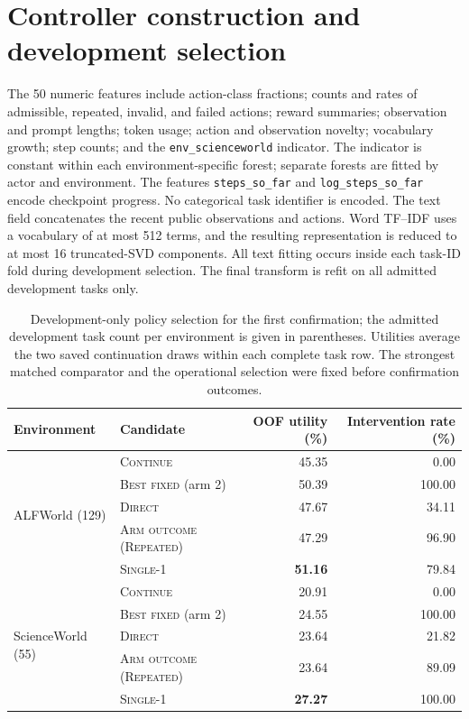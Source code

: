 \section{Controller construction and development selection}
\label{app:controller}

The 50 numeric features include action-class fractions; counts and rates of admissible, repeated, invalid, and failed actions; reward summaries; observation and prompt lengths; token usage; action and observation novelty; vocabulary growth; step counts; and the \texttt{env\_scienceworld} indicator. The indicator is constant within each environment-specific forest; separate forests are fitted by actor and environment. The features \texttt{steps\_so\_far} and \texttt{log\_steps\_so\_far} encode checkpoint progress. No categorical task identifier is encoded. The text field concatenates the recent public observations and actions. Word TF--IDF uses a vocabulary of at most 512 terms, and the resulting representation is reduced to at most 16 truncated-SVD components. All text fitting occurs inside each task-ID fold during development selection. The final transform is refit on all admitted development tasks only.

\begin{table}[ht]
\caption{Development-only policy selection for the first confirmation; the admitted development task count per environment is given in parentheses. Utilities average the two saved continuation draws within each complete task row. The strongest matched comparator and the operational selection were fixed before confirmation outcomes.}
\label{tab:development}
\centering
\small
\begin{tabular}{@{}llrr@{}}
\toprule
Environment & Candidate & OOF utility (\%) & Intervention rate (\%) \\
\midrule
\multirow{5}{*}{ALFWorld (129)}
& \textsc{Continue} & 45.35 & 0.00 \\
& \textsc{Best fixed} (arm 2) & 50.39 & 100.00 \\
& \textsc{Direct} & 47.67 & 34.11 \\
& \textsc{Arm outcome} (\textsc{Repeated}) & 47.29 & 96.90 \\
& \textsc{Single-1} & \textbf{51.16} & 79.84 \\
\midrule
\multirow{5}{*}{ScienceWorld (55)}
& \textsc{Continue} & 20.91 & 0.00 \\
& \textsc{Best fixed} (arm 2) & 24.55 & 100.00 \\
& \textsc{Direct} & 23.64 & 21.82 \\
& \textsc{Arm outcome} (\textsc{Repeated}) & 23.64 & 89.09 \\
& \textsc{Single-1} & \textbf{27.27} & 100.00 \\
\bottomrule
\end{tabular}
\end{table}

